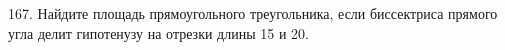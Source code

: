 167. Найдите площадь прямоугольного треугольника, если биссектриса прямого угла делит гипотенузу на отрезки длины 15 и 20.\\
